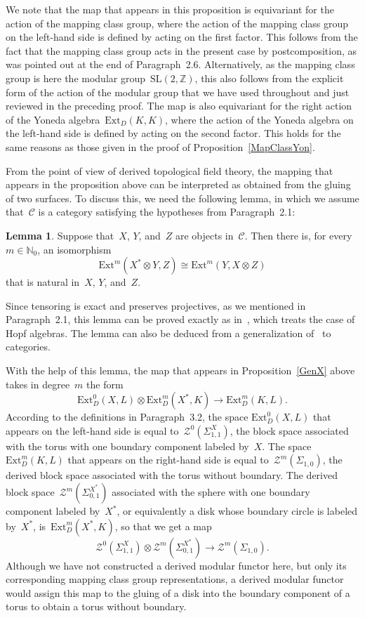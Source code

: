\documentclass[12pt]{article}
\makeatletter
\theoremstyle{definition}
\newtheorem{Lemma}[Satz]{Lemma}
\theoremstyle{break}
\renewenvironment{proof}[1][\proofname]{\par
\vspace{-5pt}%
\pushQED{\qed}%
\normalfont
\topsep0pt \partopsep0pt %
\trivlist
\item[\hskip\labelsep
\bfseries
#1\@addpunct{.}]\ignorespaces
}{%
\popQED\endtrivlist\@endpefalse
\addvspace{6pt plus 6pt} %
}
\newcommand{\Z}{\mathbb{Z}}
\newcommand{\N}{\mathbb{N}}
\newcommand{\CC}{\mathcal{C}}
\newcommand{\SL}{\mathrm{SL}}
\newcommand{\Ext}{\mathrm{Ext}}
\renewcommand{\1}{\mathbbm{1}}
\newcommand{\TFT}{\mathcal{Z}}
\newcommand{\ot}{\mathbin{\otimes}}
\makeatother
\begin{document}
We note that the map that appears in this proposition is equivariant for the action of the mapping class group, where the action of the mapping class group on the left-hand side is defined by acting on the first factor. This follows from the fact that the mapping class group acts in the present case by postcomposition, as was pointed out at the end of Paragraph~2.6. Alternatively, as the mapping class group is here the modular group~$\SL(2 ,\Z)$, this also follows from the explicit form of the action of the modular group that we have used throughout and just reviewed in the preceding proof. The map is also equivariant for the right action of the Yoneda algebra~$\Ext_D(K,K)$, where the action of the Yoneda algebra on the left-hand side is defined by acting on the second factor. This holds for the same reasons as those given in the proof of Proposition~\ref{MapClassYon}.

From the point of view of derived topological field theory, the mapping that appears in the proposition above can be interpreted as obtained from the gluing of two surfaces. To discuss this, we need the following lemma, in which we assume that~$\CC$ is a category satisfying the hypotheses from Paragraph~2.1:
\begin{Lemma} \label{ExtAdj}
Suppose that~$X$, $Y$, and~$Z$ are objects in~$\CC$. Then there is, for every~$m \in \N_0$, an isomorphism
\[\Ext^m(X^* \ot Y, Z) \cong \Ext^m(Y, X \ot Z)\]
that is natural in~$X$, $Y$, and~$Z$.
\end{Lemma}
\begin{proof}
Since tensoring is exact and preserves projectives, as we mentioned in Paragraph~2.1, this lemma can be proved exactly as in~\cite[Rem.~9.3.2, p.~191]{W2}, which treats the case of Hopf algebras. The lemma can also be deduced from a generalization of~\cite[Chap.~IV, Sec.~12, Eq.~(12.1), p.~163]{HiS} to categories.
\end{proof}

With the help of this lemma, the map that appears in Proposition~\ref{GenX} above takes in degree~$m$ the form
\[\Ext^0_D(X, L) \ot \Ext^m_D(X^*, K) \to \Ext^m_D(K, L).\]
According to the definitions in Paragraph~3.2, the space $\Ext^0_D(X, L)$ that appears on the left-hand side is equal to~$\TFT^0(\Sigma_{1,1}^X)$, the block space associated with the torus with one boundary component labeled by~$X$. The space~$\Ext^m_D(K, L)$ that appears on the right-hand side is equal to~$\TFT^m(\Sigma_{1,0})$, the derived block space associated with the torus without boundary. The derived block space~$\TFT^m(\Sigma_{0,1}^{X^*})$ associated with the sphere with one boundary component labeled by~$X^*$, or equivalently a disk whose boundary circle is labeled by~$X^*$, is~$\Ext^m_D(X^*, K)$, so that we get a map
\[\TFT^0(\Sigma_{1,1}^X) \ot \TFT^m(\Sigma_{0,1}^{X^*}) \to \TFT^m(\Sigma_{1,0}).\]
Although we have not constructed a derived modular functor here, but only its corresponding mapping class group representations, a derived modular functor would assign this map to the gluing of a disk into the boundary component of a torus to obtain a torus without boundary.
\end{document}
